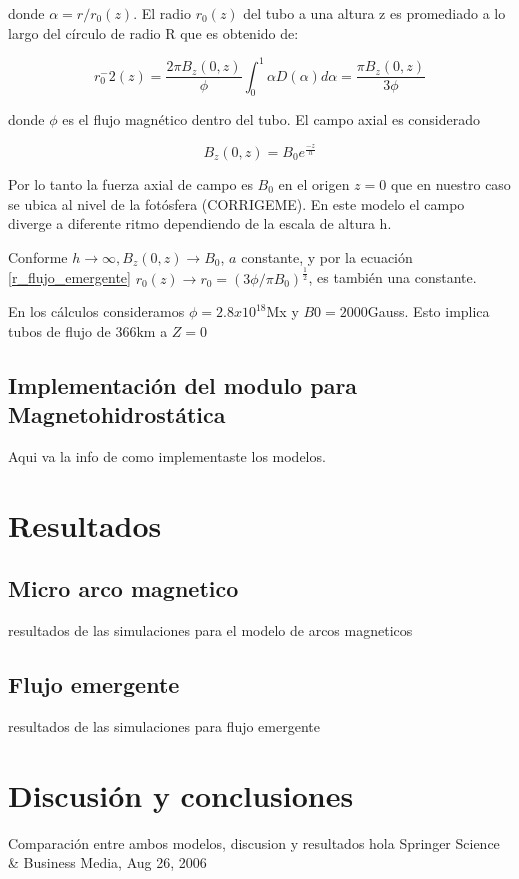 \documentclass[9pt]{book}
\begin{document}
donde $\alpha = r/r_0(z)$. El radio $r_0(z)$ del tubo a una altura z es promediado a lo largo del c\'irculo de radio R que es obtenido de:

\begin{equation} \label{r_flujo_emergente}
r_0^-2(z) = \frac{2\pi B_z(0,z)}{\phi} \int_{0}^{1} \alpha D(\alpha) d\alpha = \frac{\pi B_z(0,z)}{3 \phi}
\end{equation}

donde $\phi$ es el flujo magn\'etico dentro del tubo.
El campo axial es considerado

\begin{equation}
B_z(0,z)=B_0e^{\frac{-z}{h}}
\end{equation}

Por lo tanto la fuerza axial de campo es $B_0$ en el origen $z=0$ que en nuestro caso se ubica al nivel de la fot\'osfera (CORRIGEME). En este modelo el campo diverge a diferente ritmo dependiendo de la escala de altura h.

Conforme $h\rightarrow \infty , B_z(0,z) \rightarrow B_0$, $a$ constante, y por la ecuaci\'on \ref{r_flujo_emergente} $r_0(z) \rightarrow r_0 = (3\phi / \pi B_0)^\frac{1}{2}$, es tambi\'en una constante.

En los c\'alculos consideramos $\phi=2.8x10^18$Mx y $B0=2000$Gauss. Esto implica tubos de flujo de 366km a $Z=0$


\section{Implementaci\'on del modulo para Magnetohidrost\'atica}
Aqui va la info de como implementaste los modelos.


\chapter{Resultados}
\section{Micro arco magnetico}
resultados de las simulaciones para el modelo de arcos magneticos
\section{Flujo emergente}
resultados de las simulaciones para flujo emergente


\chapter{Discusi\'on y conclusiones}
Comparaci\'on entre ambos modelos, discusion y resultados
hola Springer Science \& Business Media, Aug 26, 2006
\end{document}

